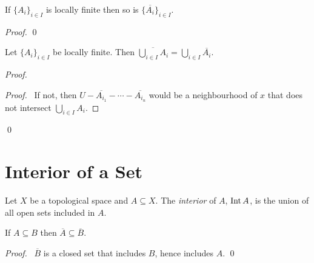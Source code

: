 \begin{lm}
  \label{lm:topology:closure:locally_finite}
  If $\{ A_i \}_{i \in I}$ is locally finite then so is $\{ \overline{A_i} \}_{i \in I}$.
\end{lm}

\begin{proof}
  \pf
  \qed
\end{proof}

\begin{lm}
  \label{lm:topology:closure:locally_finite_union}
  Let $\{ A_i \}_{i \in I}$ be locally finite. Then $\overline{\bigcup_{i \in I} A_i} = \bigcup_{i \in I} \overline{A_i}$.
\end{lm}

\begin{proof}
  \pf
  \begin{proof}
    \pf\ If not, then $U - \overline{A_{i_1}} - \cdots - \overline{A_{i_n}}$ would be a neighbourhood of $x$ that does not intersect $\bigcup_{i \in I} A_i$.
  \end{proof}
  \qed
\end{proof}

\section{Interior of a Set}

\begin{df}[Interior]
  Let $X$ be a topological space and $A \subseteq X$.
  The \emph{interior} of $A$, $\operatorname{Int} A$, is the union of all open sets
  included
  in $A$.
\end{df}

\begin{lm}
  If $A \subseteq B$ then $\overline{A} \subseteq \overline{B}$.
\end{lm}

\begin{proof}
  \pf\ $\overline{B}$ is a closed set that includes $B$, hence includes $A$.
  \qed
\end{proof}

